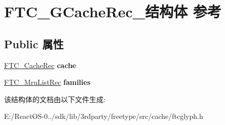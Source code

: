 \hypertarget{struct_f_t_c___g_cache_rec__}{}\section{F\+T\+C\+\_\+\+G\+Cache\+Rec\+\_\+结构体 参考}
\label{struct_f_t_c___g_cache_rec__}
\subsection*{Public 属性}
\begin{DoxyCompactItemize}
\item 
\mbox{\label{struct_f_t_c___g_cache_rec___ad89d248ec407429c9fb217bc8f64ad75}} 
\hyperlink{struct_f_t_c___cache_rec__}{F\+T\+C\+\_\+\+Cache\+Rec} {\bfseries cache}
\item 
\mbox{\label{struct_f_t_c___g_cache_rec___a1fc527b6d1198813130df1568837d4b4}} 
\hyperlink{struct_f_t_c___mru_list_rec__}{F\+T\+C\+\_\+\+Mru\+List\+Rec} {\bfseries families}
\end{DoxyCompactItemize}


该结构体的文档由以下文件生成\+:\begin{DoxyCompactItemize}
\item 
E\+:/\+React\+O\+S-\/0../sdk/lib/3rdparty/freetype/src/cache/ftcglyph.\+h\end{DoxyCompactItemize}
